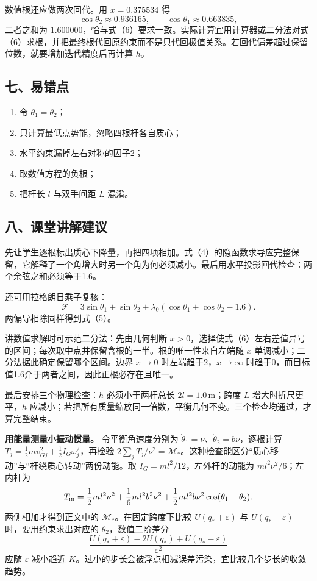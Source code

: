 \documentclass[12pt,a4paper,UTF8]{ctexart}
\newcommand{\tightlist}{\setlength{\itemsep}{0pt}\setlength{\parskip}{0pt}}
\begin{document}
数值根还应做两次回代。用 \(x=0.375534\) 得 \[
\cos\theta_2\approx0.936165,
\qquad
\cos\theta_1\approx0.663835,
\] 二者之和为
\(1.600000\)，恰与式（6）要求一致。实际计算宜用计算器或二分法对式（6）求根，并把最终根代回原约束而不是只代回极值关系。若回代偏差超过保留位数，就要增加迭代精度后再计算
\(h\)。

\subsection{七、易错点}\label{ux4e03ux6613ux9519ux70b9}

\begin{enumerate}
\def\labelenumi{\arabic{enumi}.}
\tightlist
\item
  令 \(\theta_1=\theta_2\)；
\item
  只计算最低点势能，忽略四根杆各自质心；
\item
  水平约束漏掉左右对称的因子2；
\item
  取数值方程的负根；
\item
  把杆长 \(l\) 与双手间距 \(L\) 混淆。
\end{enumerate}

\subsection{八、课堂讲解建议}\label{ux516bux8bfeux5802ux8bb2ux89e3ux5efaux8bae}

先让学生逐根标出质心下降量，再把四项相加。式（4）的隐函数求导应完整保留，它解释了一个角增大时另一个角为何必须减小。最后用水平投影回代检查：两个余弦之和必须等于1.6。

还可用拉格朗日乘子复核： \[
\mathcal F=3\sin\theta_1+\sin\theta_2
+\lambda_0(\cos\theta_1+\cos\theta_2-1.6).
\] 两偏导相除同样得到式（5）。

讲数值求解时可示范二分法：先由几何判断
\(x>0\)，选择使式（6）左右差值异号的区间；每次取中点并保留含根的一半。根的唯一性来自左端随
\(x\) 单调减小；二分法据此确定保留哪个区间。边界 \(x\to0\)
时左端趋于2，\(x\to\infty\)
时趋于0，而目标值1.6介于两者之间，因此正根必存在且唯一。

最后安排三个物理检查：\(h\) 必须小于两杆总长 \(2l=1.0\,\mathrm m\)；跨度
\(L\) 增大时折尺更平，\(h\)
应减小；若把所有质量缩放同一倍数，平衡几何不变。三个检查均通过，才算完整结束。

\textbf{用能量测量小振动惯量。} 令平衡角速度分别为
\(\dot\theta_1=\nu\)、\(\dot\theta_2=b\nu\)，逐根计算
\(T_j=\tfrac12m v_{Gj}^2+\tfrac12 I_G\omega_j^2\)，再检验
\(2\sum_jT_j/\nu^2=\mathcal M_*\)。这种检查能区分``质心移动''与``杆绕质心转动''两份动能。取
\(I_G=ml^2/12\)，左外杆的动能为 \(ml^2\nu^2/6\)；左内杆为 \[
T_{\rm in}=\frac12ml^2\nu^2+\frac16ml^2b^2\nu^2
+\frac12ml^2b\nu^2\cos(\theta_1-\theta_2).
\] 两侧相加才得到正文中的 \(\mathcal M_*\)。在固定跨度下比较
\(U(q_*+\varepsilon)\) 与 \(U(q_*-\varepsilon)\) 时，要用约束求出对应的
\(\theta_2\)，数值二阶差分 \[
\frac{U(q_*+\varepsilon)-2U(q_*)+U(q_*-\varepsilon)}{\varepsilon^2}
\] 应随 \(\varepsilon\) 减小趋近
\(K\)。过小的步长会被浮点相减误差污染，宜比较几个步长的收敛趋势。
\end{document}
